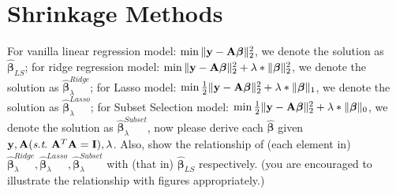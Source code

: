 \documentclass[11pt]{article}
\newcommand{\vct}[1]{\mathbf{#1}}
\def \mA {\mtx{A}}
\def \mI {\mtx{I}}
\def \vy {\vct{y}}
\begin{document}
\section*{Shrinkage Methods}
For vanilla linear regression model: $\min \|\vy-\mA\bm{\beta}\|_2^2$, 
we denote the solution as $\hat{\bm{\beta}}_{LS}$; for ridge regression model: $\min \|\vy-\mA\bm{\beta}\|_2^2+\lambda*\|\bm{\beta}\|_2^2$, we denote the solution as $\hat{\bm{\beta}}_\lambda^{Ridge}$; for Lasso model: $\min \frac{1}{2}\|\vy-\mA\bm{\beta}\|_2^2+\lambda*\|\bm{\beta}\|_1$, we denote the solution as $\hat{\bm{\beta}}_\lambda^{Lasso}$; for Subset Selection model:  $\min \frac{1}{2}\|\vy-\mA\bm{\beta}\|_2^2+\lambda*\|\bm{\beta}\|_0$, we denote the solution as $\hat{\bm{\beta}}_\lambda^{Subset}$, now please derive each $\hat{\bm{\beta}}$ given $\vy, \mA  (\st \ \mA^T\mA=\mI), \lambda$. Also, show the relationship of (each element in) $\hat{\bm{\beta}}_\lambda^{Ridge}, \hat{\bm{\beta}}_\lambda^{Lasso}, \hat{\bm{\beta}}_\lambda^{Subset}$ with (that in) $\hat{\bm{\beta}}_{LS}$ respectively. (you are encouraged to illustrate the relationship with figures appropriately.)
\vspace{4cm}
\end{document}
